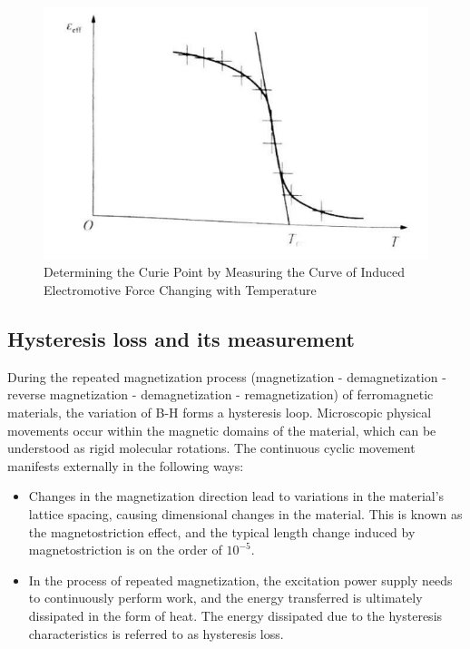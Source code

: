 \documentclass[UTF8]{article}
\begin{document}
       \begin{figure}[H]
           	    	\centering
           	    	\includegraphics[clip,scale=0.9,trim={0 0 0 0}]{fig/fig9.png}
           	        \caption{Determining the Curie Point by Measuring the Curve of Induced Electromotive Force Changing with Temperature}
           	        \label{figure.1}
               \end{figure}    
               
    \subsection{Hysteresis loss and its measurement}
      During the repeated magnetization process (magnetization - demagnetization - reverse magnetization - demagnetization - remagnetization) of ferromagnetic materials, the variation of B-H forms a hysteresis loop. Microscopic physical movements occur within the magnetic domains of the material, which can be understood as rigid molecular rotations. The continuous cyclic movement manifests externally in the following ways:
      
      \begin{itemize}
          \item Changes in the magnetization direction lead to variations in the material's lattice spacing, causing dimensional changes in the material. This is known as the magnetostriction effect, and the typical length change induced by magnetostriction is on the order of \(10^{-5}\).
          \item In the process of repeated magnetization, the excitation power supply needs to continuously perform work, and the energy transferred is ultimately dissipated in the form of heat. The energy dissipated due to the hysteresis characteristics is referred to as hysteresis loss.
      \end{itemize}
      
\end{document}

